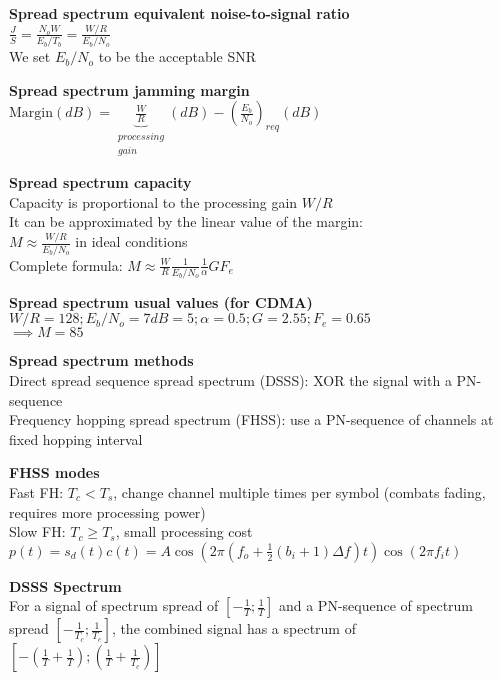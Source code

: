 \documentclass[10pt,letterpaper,landscape]{report}
\newcommand{\boxheight}{21.59cm}
\newcommand{\boxwidth}{8.85cm}
\begin{document}
\begin{small}
{\begin{minipage}[t][\boxheight][c]{\boxwidth}
    \textbf{Spread spectrum equivalent noise-to-signal ratio}\\
    $\frac{J}{S} = \frac{N_o W}{E_b/T_b} = \frac{W/R}{E_b/N_o}$\\
    We set $E_b/N_o$ to be the acceptable SNR
    
    \textbf{Spread spectrum jamming margin}\\
    $\text{Margin}(dB)  =\underbrace{\frac{W}{R}}_{\substack{processing\\ gain}}(dB) - \left(\frac{E_b}{N_o}\right)_{req}(dB)$
    
    \textbf{Spread spectrum capacity}\\
    Capacity is proportional to the processing gain $W/R$\\
    It can be approximated by the linear value of the margin:\\
    $M \approx \frac{W/R}{E_b/N_o}$ in ideal conditions\\
    Complete formula: $\boxed{M\approx \frac{W}{R}\frac{1}{E_b/N_o}\frac{1}{\alpha}GF_e}$
    
    \textbf{Spread spectrum usual values (for CDMA)}\\
    $W/R = 128; E_b/N_o=7dB=5; \alpha=0.5; G=2.55; F_e=0.65$\\
    $\implies M = 85$

    \textbf{Spread spectrum methods}\\
    Direct spread sequence spread spectrum (DSSS): XOR the signal with a PN-sequence\\
    Frequency hopping spread spectrum (FHSS): use a PN-sequence of channels at fixed hopping interval
    
    \textbf{FHSS modes}\\
    Fast FH: $T_c < T_s$, change channel multiple times per symbol (combats fading, requires more processing power)\\
    Slow FH: $T_c \geq T_s$, small processing cost\\
    $p(t) = s_d(t)c(t) = A\cos\left(2\pi \left(f_o + \frac{1}{2}(b_i + 1)\Delta f\right)t\right)\cos(2\pi f_i t)$
    
    \textbf{DSSS Spectrum}\\
    For a signal of spectrum spread of $\left[-\frac{1}{T};\frac{1}{T}\right]$ and a PN-sequence of spectrum spread $\left[-\frac{1}{T_c};\frac{1}{T_c}\right]$, the combined signal has  a spectrum of $\left[-\left(\frac{1}{T}+\frac{1}{T}\right);\left(\frac{1}{T}+\frac{1}{T_c}\right)\right]$
    

\end{minipage}}
\end{small}
\end{document}
